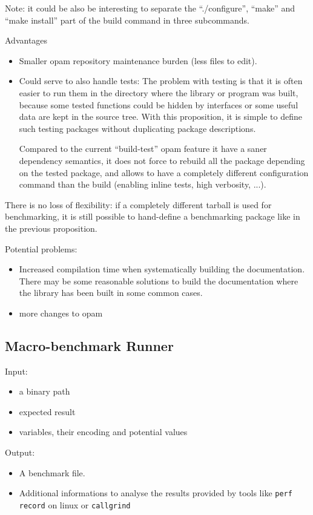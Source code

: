 \documentclass[11pt,a4paper]{article}
\begin{document}
Note: it could be also be interesting to separate the ``./configure'',
``make'' and ``make install'' part of the build command in three
subcommands.

Advantages
\begin{itemize}
\item Smaller opam repository maintenance burden (less files to edit).
\item Could serve to also handle tests: The problem with testing is
  that it is often easier to run them in the directory where the
  library or program was built, because some tested functions could be
  hidden by interfaces or some useful data are kept in the source
  tree. With this proposition, it is simple to define such testing
  packages without duplicating package descriptions.

  Compared to the current ``build-test'' opam feature it have a saner
  dependency semantics, it does not force to rebuild all the package
  depending on the tested package, and allows to have a completely
  different configuration command than the build (enabling inline
  tests, high verbosity, ...).
\end{itemize}

There is no loss of flexibility: if a completely different tarball is
used for benchmarking, it is still possible to hand-define a
benchmarking package like in the previous proposition.

Potential problems:
\begin{itemize}
\item Increased compilation time when systematically building the
  documentation. There may be some reasonable solutions to build the
  documentation where the library has been built in some common cases.
\item more changes to opam
\end{itemize}

\subsection{Macro-benchmark Runner}

Input:
\begin{itemize}
\item a binary path
\item expected result
\item variables, their encoding and potential values
\end{itemize}

Output:
\begin{itemize}
\item A benchmark file.
\item Additional informations to analyse the results provided by
  tools like \texttt{perf record} on linux or \texttt{callgrind}
\end{itemize}
\end{document}
